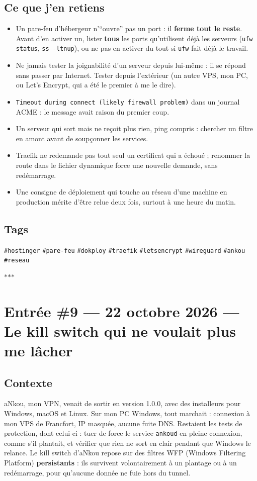 \documentclass[10pt,twoside,openany]{article}
\newcommand{\entryrule}{\par\vspace{1.2em}\begin{center}\color{accentblue}$\ast$\quad$\ast$\quad$\ast$\end{center}\par}
\newcommand{\tag}[1]{\texttt{\footnotesize\color{tagolive}\#{#1}}}
\begin{document}
\subsection*{Ce que j'en retiens}
\begin{itemize}
  \item Un pare-feu d'hébergeur n'\enquote{ouvre} pas un port : il \textbf{ferme tout le reste}. Avant d'en activer un, lister \textbf{tous} les ports qu'utilisent déjà les serveurs (\texttt{ufw status}, \texttt{ss -ltnup}), ou ne pas en activer du tout si \texttt{ufw} fait déjà le travail.
  \item Ne jamais tester la joignabilité d'un serveur depuis lui-même : il se répond sans passer par Internet. Tester depuis l'extérieur (un autre VPS, mon PC, ou Let's Encrypt, qui a été le premier à me le dire).
  \item \texttt{Timeout during connect (likely firewall problem)} dans un journal ACME : le message avait raison du premier coup.
  \item Un serveur qui sort mais ne reçoit plus rien, ping compris : chercher un filtre en amont avant de soupçonner les services.
  \item Traefik ne redemande pas tout seul un certificat qui a échoué ; renommer la route dans le fichier dynamique force une nouvelle demande, sans redémarrage.
  \item Une consigne de déploiement qui touche au réseau d'une machine en production mérite d'être relue deux fois, surtout à une heure du matin.
\end{itemize}

\subsection*{Tags}
\tag{hostinger} \quad \tag{pare-feu} \quad \tag{dokploy} \quad \tag{traefik} \quad \tag{letsencrypt} \quad \tag{wireguard} \quad \tag{ankou} \quad \tag{reseau}

\entryrule


\section{Entrée \#9 --- 22 octobre 2026 --- Le kill switch qui ne voulait plus me lâcher}

\subsection*{Contexte}
aNkou, mon VPN, venait de sortir en version 1.0.0, avec des installeurs pour Windows, macOS et Linux. Sur mon PC Windows, tout marchait : connexion à mon VPS de Francfort, IP masquée, aucune fuite DNS. Restaient les tests de protection, dont celui-ci : tuer de force le service \texttt{ankoud} en pleine connexion, comme s'il plantait, et vérifier que rien ne sort en clair pendant que Windows le relance. Le kill switch d'aNkou repose sur des filtres WFP (Windows Filtering Platform) \textbf{persistants} : ils survivent volontairement à un plantage ou à un redémarrage, pour qu'aucune donnée ne fuie hors du tunnel.
\end{document}
